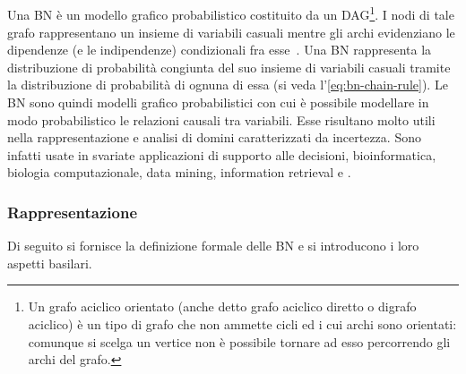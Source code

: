 \subsection{\bn{}}\label{subsec:bn}
Una \acl{BN} è un modello grafico probabilistico costituito da un \acf{DAG}\footnote{\label{note:DAG}Un grafo aciclico orientato (anche detto grafo aciclico diretto o digrafo aciclico) è un tipo di grafo che non ammette cicli ed i cui archi sono orientati: comunque si scelga un vertice non è possibile tornare ad esso percorrendo gli archi del grafo.}. I nodi di tale grafo rappresentano un insieme di variabili casuali mentre gli archi evidenziano le dipendenze (e le indipendenze) condizionali fra esse~\citep{Korb2011}.
Una \acs{BN} rappresenta la distribuzione di probabilità congiunta del suo insieme di variabili casuali tramite la distribuzione di probabilità \cond*{} di ognuna di essa (si veda l'\autoref{eq:bn-chain-rule}).
Le \acs{BN} sono quindi modelli grafico probabilistici con cui è possibile modellare in modo probabilistico le relazioni causali tra variabili. Esse risultano molto utili nella rappresentazione e analisi di domini caratterizzati da incertezza. Sono infatti usate in svariate applicazioni di supporto alle decisioni, bioinformatica, biologia computazionale, data mining, information retrieval e .

\subsubsection{Rappresentazione}\label{subsec:bn-representation}
Di seguito si fornisce la definizione formale delle \acl{BN} e si introducono i loro aspetti basilari.

